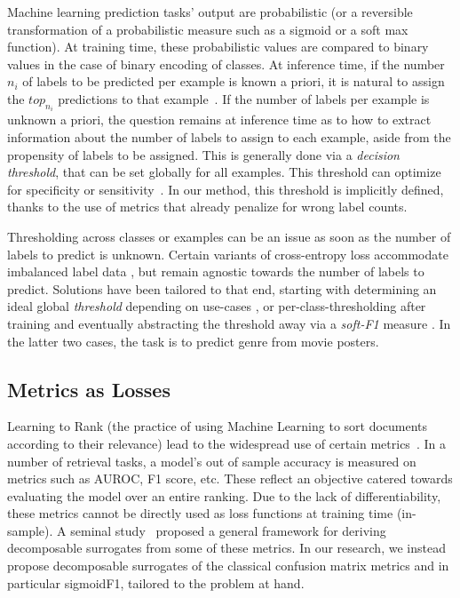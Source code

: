 Machine learning prediction tasks' output are probabilistic (or a reversible
transformation of a probabilistic measure such as a sigmoid or a soft max
function). At training time, these probabilistic values are compared to binary
values in the case of binary encoding of classes. At inference time, if the
number $n_i$ of labels to be predicted per example is known a priori, it is
natural to assign the $top_{n_i}$ predictions to that
example~\cite{lossTopKError, topKmulticlassSVM}. If the number of labels per
example is unknown a priori, the question remains at inference time as to how
to extract information about the number of labels to assign to each example,
aside from the propensity of labels to be assigned. This is generally done via
a \emph{decision threshold}, that can be set globally for all examples. This
threshold can optimize for specificity or
sensitivity~\cite{decisionThreshold}. In our method, this threshold is
implicitly defined, thanks to the use of metrics that already penalize for
wrong label counts.

Thresholding across classes or examples can be an issue as soon as the number
of labels to predict is unknown. Certain variants of cross-entropy loss
accommodate imbalanced label data  \cite{focalLoss}, but remain agnostic
towards the number of labels to predict. Solutions have been tailored to that
end, starting with determining an ideal global \emph{threshold} depending on
use-cases \cite{threshForF1}, or per-class-thresholding after training
\cite{moviePosters} and eventually abstracting the threshold away via a
\emph{soft-F1} measure \cite{softF1}. In the latter two cases, the task is to
predict genre from movie posters.

\subsection{Metrics as Losses}

Learning to Rank (the practice of using Machine Learning to sort documents
according to their relevance) lead to the widespread use of certain
metrics~\cite{LTR}. In a number of retrieval tasks, a model's out of sample
accuracy is measured on metrics such as AUROC, F1 score, etc. These reflect an
objective catered towards evaluating the model over an entire ranking. Due to
the lack of differentiability, these metrics cannot be directly used as loss
functions at training time (in-sample). A seminal
study~\cite{optimizableLosses} proposed a general framework for deriving
decomposable surrogates from some of these metrics. In our research, we
instead propose decomposable surrogates of the classical confusion matrix
metrics and in particular sigmoidF1, tailored to the problem at hand.

